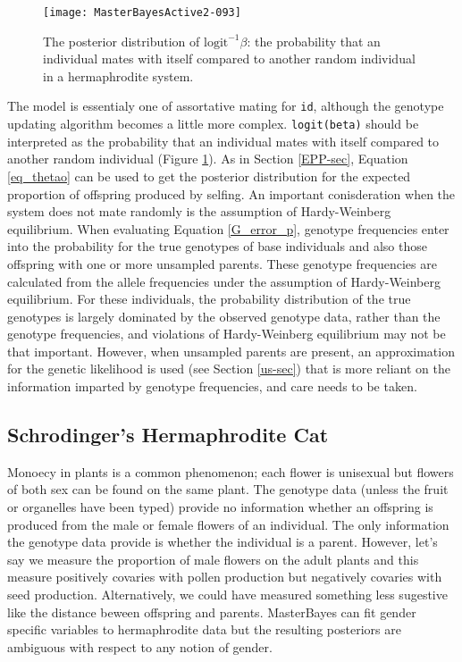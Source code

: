 \documentclass{article}
\begin{document}
\begin{figure}[!h]
\begin{center}
\texttt{[image: MasterBayesActive2-093]}
\end{center}
\caption{The posterior distribution of $\textrm{logit}^{-1}\beta$: the probability that an individual mates with itself compared to another random individual in a hermaphrodite system.}
\label{Herm-fig}
\end{figure}

The model is essentialy one of assortative mating for \texttt{id}, although the genotype updating algorithm becomes a little more complex.  \texttt{logit(beta)} should be interpreted as the probability that an individual mates with itself compared to another random individual (Figure \ref{Herm-fig}).  As in Section \ref{EPP-sec}, Equation \ref{eq_thetao} can be used to get the posterior distribution for the expected proportion of offspring produced by selfing.  An important conisderation when the system does not mate randomly is the assumption of Hardy-Weinberg equilibrium.  When evaluating Equation \ref{G_error_p}, genotype frequencies enter into the probability for the true genotypes of base individuals and also those offspring with one or more unsampled parents. These genotype frequencies are calculated from the allele frequencies under the assumption of Hardy-Weinberg equilibrium. For these individuals, the probability distribution of the true genotypes is largely dominated by the observed genotype data, rather than the genotype frequencies, and violations of Hardy-Weinberg equilibrium may not be that important.  However, when unsampled parents are present, an approximation for the genetic likelihood is used (see Section \ref{us-sec}) that is more reliant on the information imparted by genotype frequencies, and care needs to be taken. 

\subsection{Schrodinger's Hermaphrodite Cat}
\label{SHC}

Monoecy in plants is a common phenomenon; each flower is unisexual but flowers of both sex can be found on the same plant.  The genotype data (unless the fruit or organelles have been typed) provide no information whether an offspring is produced from the male or female flowers of an individual. The only information the genotype data provide is whether the individual is a parent.  However, let's say we measure the proportion of male flowers on the adult plants and this measure positively covaries with pollen production but negatively covaries with seed production.  Alternatively, we could have measured something less sugestive like the distance beween offspring and parents.  MasterBayes can fit gender specific variables to hermaphrodite data but the resulting posteriors are ambiguous with respect to any notion of gender.\\
\end{document}

